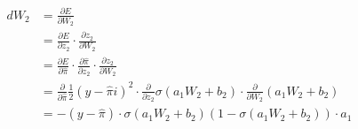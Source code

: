 \begin{align*}
dW_{2} &= \frac{\partial E}{\partial W_{2}}\\
&= \frac{\partial E}{\partial z_{2}}\cdot \frac{\partial z_{2}}{\partial W_{2}}\\
&= \frac{\partial E}{\partial \hat{\pi}} \cdot \frac{\partial \hat{\pi}}{\partial z_{2}} \cdot \frac{\partial z_{2}}{\partial W_{2}}\\
&= \frac{\partial }{\partial \hat{\pi}} \frac{1}{2}(y-\hat{\pi}i)^{2} \cdot \frac{\partial }{\partial z_{2}} \sigma(a_{1}W_{2} + b_{2})\cdot \frac{\partial }{\partial W_{2}}(a_{1}W_{2}+b_{2})\\
&= -(y-\hat{\pi}) \cdot \sigma(a_{1}W_{2}+b_{2})(1-\sigma(a_{1}W_{2}+b_{2}))\cdot a_{1}\\

\end{align*}
